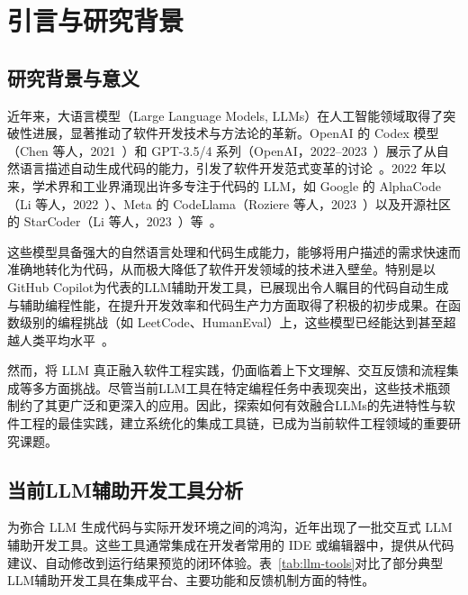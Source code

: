 
\chapter{引言与研究背景}

\section{研究背景与意义}

近年来，大语言模型（Large Language Models, LLMs）在人工智能领域取得了突破性进展，显著推动了软件开发技术与方法论的革新。OpenAI 的 Codex 模型（Chen 等人，2021~\cite{Chen2021}）和 GPT-3.5/4 系列（OpenAI，2022--2023~\cite{OpenAI2022}）展示了从自然语言描述自动生成代码的能力，引发了软件开发范式变革的讨论~\cite{arxiv2401}。2022 年以来，学术界和工业界涌现出许多专注于代码的 LLM，如 Google 的 AlphaCode（Li 等人，2022~\cite{Li2022AlphaCode}）、Meta 的 CodeLlama（Roziere 等人，2023~\cite{Roziere2023}）以及开源社区的 StarCoder（Li 等人，2023~\cite{Li2023StarCoder}）等~\cite{arxiv2401}。

这些模型具备强大的自然语言处理和代码生成能力，能够将用户描述的需求快速而准确地转化为代码，从而极大降低了软件开发领域的技术进入壁垒。特别是以GitHub Copilot为代表的LLM辅助开发工具，已展现出令人瞩目的代码自动生成与辅助编程性能，在提升开发效率和代码生产力方面取得了积极的初步成果。在函数级别的编程挑战（如 LeetCode、HumanEval）上，这些模型已经能达到甚至超越人类平均水平~\cite{LLMCodeGraph2024}。

然而，将 LLM 真正融入软件工程实践，仍面临着上下文理解、交互反馈和流程集成等多方面挑战。尽管当前LLM工具在特定编程任务中表现突出，这些技术瓶颈制约了其更广泛和更深入的应用。因此，探索如何有效融合LLMs的先进特性与软件工程的最佳实践，建立系统化的集成工具链，已成为当前软件工程领域的重要研究课题。

\section{当前LLM辅助开发工具分析}

为弥合 LLM 生成代码与实际开发环境之间的鸿沟，近年出现了一批交互式 LLM 辅助开发工具。这些工具通常集成在开发者常用的 IDE 或编辑器中，提供从代码建议、自动修改到运行结果预览的闭环体验。表~\ref{tab:llm-tools}对比了部分典型LLM辅助开发工具在集成平台、主要功能和反馈机制方面的特性。

